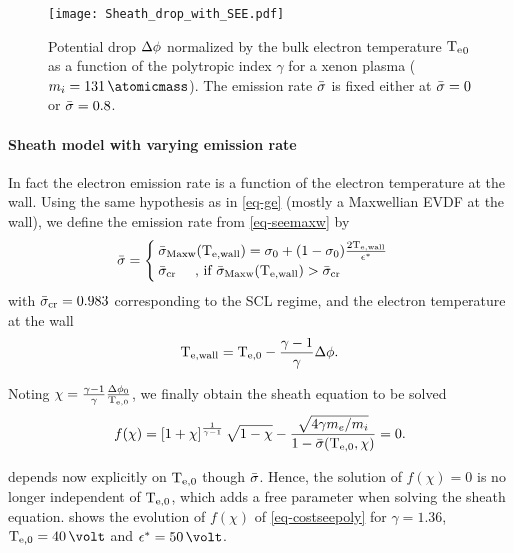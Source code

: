 \begin{figure}[!hbt]
  \centering
  \texttt{[image: Sheath\_drop\_with\_SEE.pdf]}
  \caption{Potential drop $\Delta \phi$ normalized by the bulk electron temperature $\mathrm{T_e}_0$ as a function of the polytropic index $\gamma$ for a xenon plasma ($m_i = 131\,\atomicmass$). The emission rate $ \bar{\sigma }$ is fixed either at $ \bar{\sigma }=0$ or $ \bar{\sigma }=0.8$.}
  \label{fig-dphi_see}
\end{figure}

\paragraph{Sheath model with varying emission rate\\}

In fact the electron emission rate is a function of the electron temperature at the wall.
Using the same hypothesis as in \cref{eq-ge} (mostly a Maxwellian \ac{EVDF} at the wall), we define the emission rate from \cref{eq-seemaxw} by
\begin{equation} \label{eq-seemaxw_poly}
   \bar{\sigma } = 
  \begin{cases}
     \bar{\sigma }_{\rm Maxw}(\mathrm{T_{e, wall}}) =  \sigma_0 + ( 1 - \sigma_0) \frac{ 2 \mathrm{T_{e, wall}}  }{\epsilon^{*}} \\
     \bar{\sigma }_{\rm cr} \text{ \quad, if }  \bar{\sigma }_{\rm Maxw}(\mathrm{T_{e, wall}}) >  \bar{\sigma }_{\rm cr}
  \end{cases}
\end{equation}
with $ \bar{\sigma }_{\rm cr} = 0.983$ corresponding to the \ac{SCL} regime, and the electron temperature at the wall
\begin{equation} \label{eq-Tewall}
  \mathrm{T_{e, wall}} = \mathrm{T_{e, 0}} - \frac{\gamma - 1}{\gamma } \Delta \phi.
\end{equation}


Noting $\chi = \frac{\gamma -1}{\gamma} \frac{ \Delta \phi_0}{ \mathrm{T_{e, 0}}} $, we finally obtain the sheath equation to be solved
\begin{equation} \label{eq-costseepoly}
  f(\chi) = \left[ 1 + \chi  \right]^{\frac{1}{\gamma - 1}} \sqrt{1 - \chi} - \frac{  \sqrt{4 \gamma m_e / m_i}}{1 -  \bar{\sigma } (\mathrm{T_{e, 0}}, \chi )} = 0.
\end{equation}

 depends now explicitly on $\mathrm{T_{e, 0}}$ though $ \bar{\sigma }$.
Hence, the solution of $f(\chi)=0$ is no longer independent of $\mathrm{T_{e, 0}}$, which adds a free parameter when solving the sheath equation.
 shows the evolution of $f(\chi)$ of \cref{eq-costseepoly} for $\gamma = 1.36$, $\Teb=40\,\volt$ and $\crover=50\,\volt$.

